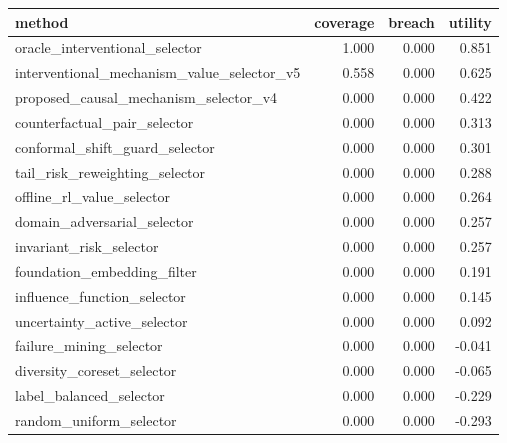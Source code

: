 \begin{tabular}{lrrr}
\toprule
method & coverage & breach & utility \\
\midrule
oracle\_interventional\_selector & 1.000 & 0.000 & 0.851 \\
interventional\_mechanism\_value\_selector\_v5 & 0.558 & 0.000 & 0.625 \\
proposed\_causal\_mechanism\_selector\_v4 & 0.000 & 0.000 & 0.422 \\
counterfactual\_pair\_selector & 0.000 & 0.000 & 0.313 \\
conformal\_shift\_guard\_selector & 0.000 & 0.000 & 0.301 \\
tail\_risk\_reweighting\_selector & 0.000 & 0.000 & 0.288 \\
offline\_rl\_value\_selector & 0.000 & 0.000 & 0.264 \\
domain\_adversarial\_selector & 0.000 & 0.000 & 0.257 \\
invariant\_risk\_selector & 0.000 & 0.000 & 0.257 \\
foundation\_embedding\_filter & 0.000 & 0.000 & 0.191 \\
influence\_function\_selector & 0.000 & 0.000 & 0.145 \\
uncertainty\_active\_selector & 0.000 & 0.000 & 0.092 \\
failure\_mining\_selector & 0.000 & 0.000 & -0.041 \\
diversity\_coreset\_selector & 0.000 & 0.000 & -0.065 \\
label\_balanced\_selector & 0.000 & 0.000 & -0.229 \\
random\_uniform\_selector & 0.000 & 0.000 & -0.293 \\
\bottomrule
\end{tabular}
